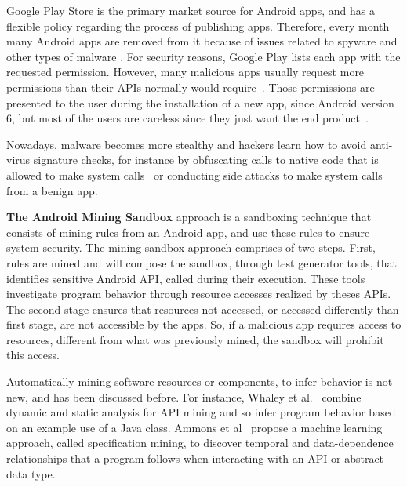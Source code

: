 Google Play Store is the primary market source for Android apps, and has a flexible policy regarding the process of publishing apps. Therefore, every month many Android apps are removed from it because of issues related to spyware and other types of malware \cite{DBLP:conf/msr/WangLL0X18}. For security reasons, Google Play lists each app with the requested permission. However, many malicious apps usually request more permissions than their APIs normally would require~\cite{DBLP:conf/ccs/FeltCHSW11}. Those permissions are presented to the user during the installation of a new app, since Android version 6, but most of the users are careless since they just want the end product~\cite{DBLP:conf/soups/FeltHEHCW12}. 

Nowadays, malware becomes more stealthy and hackers learn how to avoid anti-virus signature checks, for instance by obfuscating calls to native code that is allowed to make system calls~\cite{DBLP:journals/corr/abs-2002-04540} or conducting side attacks to make system calls from a benign app.

\textbf{The Android Mining Sandbox} approach is a sandboxing technique that consists of mining rules from an Android app, and use these rules to ensure system security. The mining sandbox approach comprises of two steps. First, rules are mined and will compose the sandbox,
through test generator tools, that identifies sensitive Android API, called during their execution. 
These tools investigate program behavior through resource accesses realized by theses APIs. The second stage ensures that resources not accessed, or accessed differently than first stage, are not accessible by the apps. So, if a malicious app requires access to resources, different from what was previously mined, the sandbox will prohibit this access.

Automatically mining software resources or components, to infer behavior is not new, and has been discussed before. For instance, Whaley et al.~\cite{DBLP:conf/issta/WhaleyML02} combine dynamic and static analysis for API mining and so infer program behavior based on an example use of a Java class. Ammons et al~\cite{DBLP:conf/popl/AmmonsBL02} propose a machine learning
approach, called specification mining, to discover temporal and data-dependence relationships that a program follows when interacting with an API or abstract data type.

